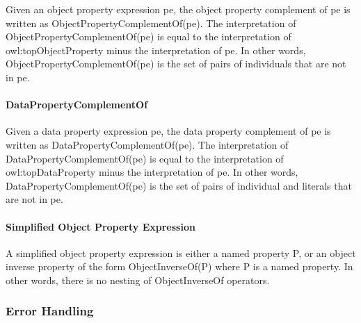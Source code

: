 Given an object property expression {\ttfamily pe}, the object property complement of {\ttfamily pe} is written as {\ttfamily Object\-Property\-Complement\-Of(pe)}. The interpretation of {\ttfamily Object\-Property\-Complement\-Of(pe)} is equal to the interpretation of {\ttfamily owl\-:top\-Object\-Property} minus the interpretation of {\ttfamily pe}. In other words, {\ttfamily Object\-Property\-Complement\-Of(pe)} is the set of pairs of individuals that are not in {\ttfamily pe}. \paragraph*{Data\-Property\-Complement\-Of}

Given a data property expression {\ttfamily pe}, the data property complement of {\ttfamily pe} is written as {\ttfamily Data\-Property\-Complement\-Of(pe)}. The interpretation of {\ttfamily Data\-Property\-Complement\-Of(pe)} is equal to the interpretation of {\ttfamily owl\-:top\-Data\-Property} minus the interpretation of {\ttfamily pe}. In other words, {\ttfamily Data\-Property\-Complement\-Of(pe)} is the set of pairs of individual and literals that are not in {\ttfamily pe}. \paragraph*{Simplified Object Property Expression}

A simplified object property expression is either a named property {\ttfamily P}, or an object inverse property of the form {\ttfamily Object\-Inverse\-Of(\-P)} where {\ttfamily P} is a named property. In other words, there is no nesting of {\ttfamily Object\-Inverse\-Of} operators. \subsubsection*{Error Handling}

